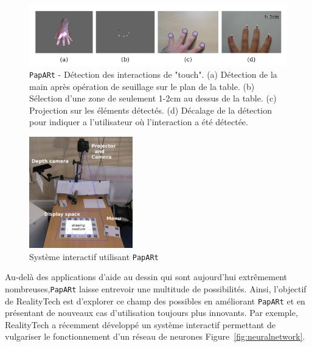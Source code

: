 \begin{figure}
\centering
\includegraphics[width=\linewidth]{images/paparttouch}
\caption{ \texttt{PapARt} - Détection des interactions de "touch". (a) Détection de la main après opération de seuillage sur le plan de la table. (b) Sélection d'une zone de seulement 1-2cm au dessus de la table. (c) Projection sur les éléments détectés. (d) Décalage de la détection pour indiquer a l'utilisateur où l'interaction a été détectée.\protect\footnotemark}
\label{fig:papart:touch}
\end{figure}


\begin{figure}[H]
\centering
\includegraphics[width=0.4\textwidth]{images/papart-system}
\caption{Système interactif utilisant \texttt{PapARt}\protect\footnotemark}
\label{fig:papartsystem}
\end{figure}


Au-delà des applications d'aide au dessin qui sont aujourd'hui extrêmement nombreuses,\texttt{PapARt} laisse entrevoir une multitude de possibilités. Ainsi, l'objectif de RealityTech est d'explorer ce champ des possibles en améliorant \texttt{PapARt} et en présentant de nouveaux cas d'utilisation toujours plus innovants. Par exemple, RealityTech a récemment développé un système interactif permettant de vulgariser le fonctionnement d'un réseau de neurones Figure~\ref{fig:neuralnetwork}.


